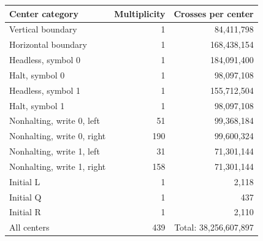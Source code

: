 \begin{center}\small
\begin{tabular}{lrr}
\toprule
Center category & Multiplicity & Crosses per center \\
\midrule
Vertical boundary & 1 & 84,411,798 \\
Horizontal boundary & 1 & 168,438,154 \\
Headless, symbol 0 & 1 & 184,091,400 \\
Halt, symbol 0 & 1 & 98,097,108 \\
Headless, symbol 1 & 1 & 155,712,504 \\
Halt, symbol 1 & 1 & 98,097,108 \\
Nonhalting, write 0, left & 51 & 99,368,184 \\
Nonhalting, write 0, right & 190 & 99,600,324 \\
Nonhalting, write 1, left & 31 & 71,301,144 \\
Nonhalting, write 1, right & 158 & 71,301,144 \\
Initial L & 1 & 2,118 \\
Initial Q & 1 & 437 \\
Initial R & 1 & 2,110 \\
\midrule
All centers & 439 & Total: 38,256,607,897 \\
\bottomrule
\end{tabular}
\end{center}
